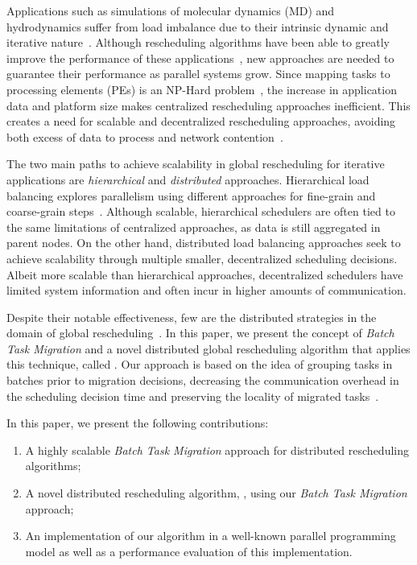 Applications such as simulations of molecular dynamics (MD) and hydrodynamics suffer from load imbalance due to their intrinsic dynamic and iterative nature~\cite{namd,IPDPS13:LULESH}.
Although rescheduling algorithms have been able to greatly improve the performance of these applications~\cite{namd}, new approaches are needed to guarantee their performance as parallel systems grow.
Since mapping tasks to processing elements (PEs) is an NP-Hard problem~\cite{npcomplete}, the increase in application data and platform size makes centralized rescheduling approaches inefficient.
This creates a need for scalable and decentralized rescheduling approaches, avoiding both excess of data to process and network contention~\cite{trahay2009scalable}.

The two main paths to achieve scalability in global rescheduling for iterative applications are \textit{hierarchical} and \textit{distributed} approaches.
Hierarchical load balancing explores parallelism using different approaches for fine-grain and coarse-grain steps~\cite{hybrid}.
Although scalable, hierarchical schedulers are often tied to the same limitations of centralized approaches, as data is still aggregated in parent nodes.
On the other hand, distributed load balancing approaches seek to achieve scalability through multiple smaller, decentralized scheduling decisions.
Albeit more scalable than hierarchical approaches, decentralized schedulers have limited system information and often incur in higher amounts of communication.

Despite their notable effectiveness, few are the distributed strategies in the domain of global rescheduling~\cite{diffus,grapevine}.
In this paper, we present the concept of \textit{Batch Task Migration} and a novel distributed global rescheduling algorithm that applies this technique, called \packdrop.
Our approach is based on the idea of grouping tasks in batches prior to migration decisions, decreasing the communication overhead in the scheduling decision time and preserving the locality of migrated tasks~\cite{Paudel2013wslocal}.

In this paper, we present the following contributions: 
\begin{enumerate}
	\item A highly scalable \textit{Batch Task Migration} approach for distributed rescheduling algorithms;
	\item A novel distributed rescheduling algorithm, \packdrop, using our \textit{Batch Task Migration} approach;
	\item An implementation of our algorithm in a well-known parallel programming model as well as a performance evaluation of this implementation.
\end{enumerate}

